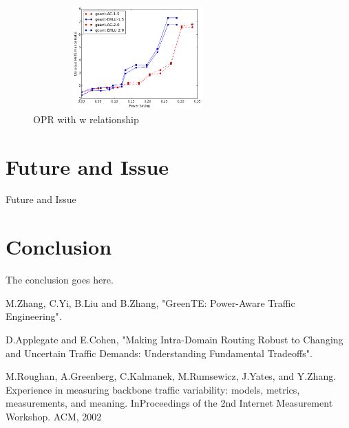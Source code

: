 \documentclass[conference]{IEEEtran}
\begin{document}
\begin{figure}
\centering
\vspace*{0.1in}
\includegraphics[width=8cm,height=4cm]{exp3_w}
\caption{OPR with w relationship}
\vspace*{0.1in}
\end{figure}


\section{Future and Issue}
Future and Issue


\section{Conclusion}
The conclusion goes here.

\begin{thebibliography}{1}

M.Zhang, C.Yi, B.Liu and B.Zhang, "GreenTE: Power-Aware Traffic Engineering".

D.Applegate and E.Cohen, "Making Intra-Domain Routing Robust to Changing and Uncertain Traffic Demands: Understanding Fundamental Tradeoffs".

M.Roughan, A.Greenberg, C.Kalmanek, M.Rumsewicz, J.Yates, and Y.Zhang. Experience in measuring backbone traffic variability: models, metrics, measurements, and meaning. InProceedings of the 2nd Internet Measurement Workshop. ACM, 2002
\end{thebibliography}


\end{document}
